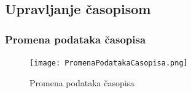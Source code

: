 \documentclass[a4paper]{article}
\begin{document}
\newpage

\subsection{Upravljanje časopisom}
\label{subsection:upravljanjecasopisom}

\subsubsection{Promena podataka časopisa}
\label{subsection:promenapodatakacasopisasec}

\begin{figure}[hbt!]
    \centering
    \texttt{[image: PromenaPodatakaCasopisa.png]}
    \caption{Promena podataka časopisa \cite{alex} \cite{vparadigm}}
    \label{fig:promenapodcas}
\end{figure}
\end{document}
